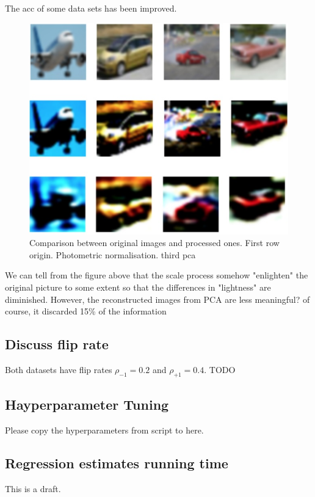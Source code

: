 \documentclass[12pt]{article} %
\newcommand{\rhoo}{\rho_{+1}}
\newcommand{\rhoz}{\rho_{-1}}
\begin{document}
The acc of some data sets has been improved.

\begin{figure} 
    \centering
	\includegraphics[scale=0.6]{img}
	\caption{Comparison between original images and processed ones. First row origin.  Photometric normalisation. third pca}
	\label{fig:Compare_Image}
\end{figure}

We can tell from the figure above that the scale process somehow "enlighten" the original picture to some extent so that the differences in "lightness" are diminished.
{\color{red} However, the reconstructed images from PCA are less meaningful? of course, it discarded 15\% of the information}


\subsection{Discuss flip rate}

Both datasets have flip rates $\rhoz=0.2$ and $\rhoo=0.4$.
{\color{red} TODO }

\subsection{Hayperparameter Tuning}
Please copy the hyperparameters from script to here.


\subsection{Regression estimates running time}
This is a draft. 
\end{document}
